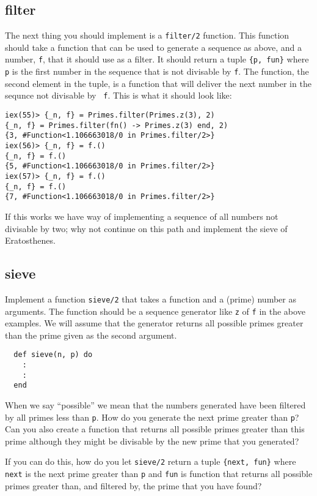 \documentclass[a4paper,11pt]{article}
\begin{document}
\subsection*{filter}

The next thing you should implement is a {\tt filter/2} function. This
function should take a function that can be used to generate a
sequence as above, and a number, {\tt f}, that it should use as a
filter. It should return a tuple {\tt \{p, fun\}} where {\tt p} is
the first number in the sequence that is not divisable by {\tt f}. The
function, the second element in the tuple, is a function that
will deliver the next number in the sequnce not divisable by {\tt
  f}. This is what it should look like:

\begin{verbatim}
iex(55)> {_n, f} = Primes.filter(Primes.z(3), 2)
{_n, f} = Primes.filter(fn() -> Primes.z(3) end, 2)
{3, #Function<1.106663018/0 in Primes.filter/2>}
iex(56)> {_n, f} = f.()
{_n, f} = f.()
{5, #Function<1.106663018/0 in Primes.filter/2>}
iex(57)> {_n, f} = f.()
{_n, f} = f.()
{7, #Function<1.106663018/0 in Primes.filter/2>}
\end{verbatim}

If this works we have way of implementing a sequence of all numbers
not divisable by two; why not continue on this path and implement
the sieve of Eratosthenes.

\subsection*{sieve}

Implement a function {\tt sieve/2} that takes a function and a (prime)
number as arguments. The function should be a sequence generator like
{\tt z} of {\tt f} in the above examples. We will assume that the
generator returns all possible primes greater than the prime given as
the second argument.

\begin{verbatim}
  def sieve(n, p) do
    :
    :
  end
\end{verbatim}

When we say ``possible'' we mean that the numbers generated have been
filtered by all primes less than {\tt p}. How do you generate the next
prime greater than {\tt p}? Can you also create a function that
returns all possible primes greater than this prime although they
might be divisable by the new prime that you generated?

If you can do this, how do you let {\tt sieve/2} return a tuple
{\tt \{next, fun\}} where {\tt next} is the next prime greater than
{\tt p} and {\tt fun} is function that returns all possible primes
  greater than, and filtered by, the prime that you have found?
\end{document}
